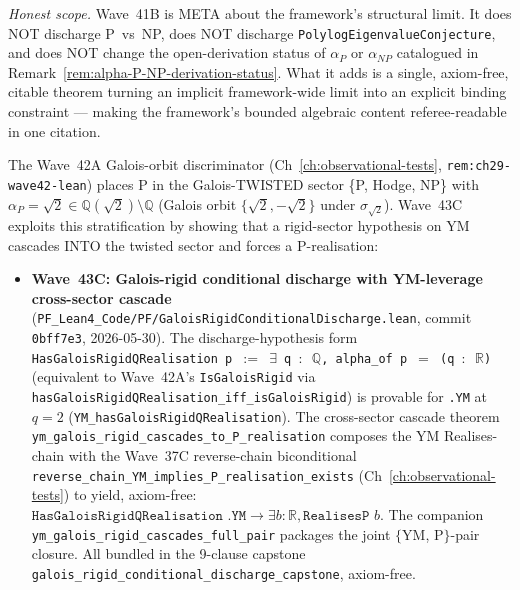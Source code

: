 \begin{remark}
\emph{Honest scope.} Wave~41B is META about the framework's structural limit. It does NOT discharge P~vs~NP, does NOT discharge \texttt{PolylogEigenvalueConjecture}, and does NOT change the open-derivation status of $\alpha_P$ or $\alpha_{NP}$ catalogued in Remark~\ref{rem:alpha-P-NP-derivation-status}. What it adds is a single, axiom-free, citable theorem turning an implicit framework-wide limit into an explicit binding constraint --- making the framework's bounded algebraic content referee-readable in one citation.
\end{remark}

\begin{remark}\label{rem:p-vs-np-wave43c-lean}
The Wave~42A Galois-orbit discriminator (Ch~\ref{ch:observational-tests}, \texttt{rem:ch29-wave42-lean}) places P in the Galois-TWISTED sector \{P, Hodge, NP\} with $\alpha_P = \sqrt{2} \in \mathbb{Q}(\sqrt{2}) \setminus \mathbb{Q}$ (Galois orbit $\{\sqrt{2}, -\sqrt{2}\}$ under $\sigma_{\sqrt{2}}$). Wave~43C exploits this stratification by showing that a rigid-sector hypothesis on YM cascades INTO the twisted sector and forces a P-realisation:
\begin{itemize}
  \item \textbf{Wave~43C: Galois-rigid conditional discharge with YM-leverage cross-sector cascade} (\texttt{PF\_Lean4\_Code/PF/GaloisRigidConditionalDischarge.lean}, commit \texttt{0bff7e3}, 2026-05-30). The discharge-hypothesis form \texttt{HasGaloisRigidQRealisation p $:=$ $\exists$ q $:$ $\mathbb{Q}$, alpha\_of p $=$ (q $:$ $\mathbb{R}$)} (equivalent to Wave~42A's \texttt{IsGaloisRigid} via \texttt{hasGaloisRigidQRealisation\_iff\_isGaloisRigid}) is provable for \texttt{.YM} at $q = 2$ (\texttt{YM\_hasGaloisRigidQRealisation}). The cross-sector cascade theorem \texttt{ym\_galois\_rigid\_cascades\_to\_P\_realisation} composes the YM Realises-chain with the Wave~37C reverse-chain biconditional \texttt{reverse\_chain\_YM\_implies\_P\_realisation\_exists} (Ch~\ref{ch:observational-tests}) to yield, axiom-free: $\texttt{HasGaloisRigidQRealisation .YM} \to \exists b : \mathbb{R}, \texttt{RealisesP } b$. The companion \texttt{ym\_galois\_rigid\_cascades\_full\_pair} packages the joint $\{$YM, P$\}$-pair closure. All bundled in the 9-clause capstone \texttt{galois\_rigid\_conditional\_discharge\_capstone}, axiom-free.
\end{itemize}

\end{remark}
